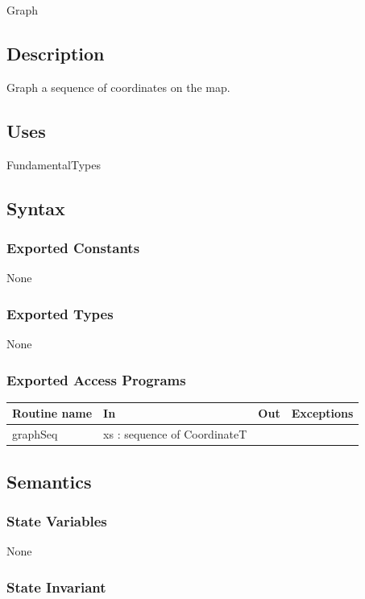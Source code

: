 \documentclass[12pt]{article}
\begin{document}
Graph

\subsection*{Description}
Graph a sequence of coordinates on the map.

\subsection* {Uses}

 FundamentalTypes

\subsection* {Syntax}

\subsubsection* {Exported Constants}

None

\subsubsection* {Exported Types}

None

\subsubsection* {Exported Access Programs}

\begin{tabular}{| l | l | l | p{5cm} |}
\hline
\textbf{Routine name} & \textbf{In} & \textbf{Out} & \textbf{Exceptions}\\
\hline
graphSeq & xs : sequence of CoordinateT & ~ & ~\\
\hline
\end{tabular}

\subsection* {Semantics}

\subsubsection* {State Variables}

None

\subsubsection* {State Invariant}
\end{document}
